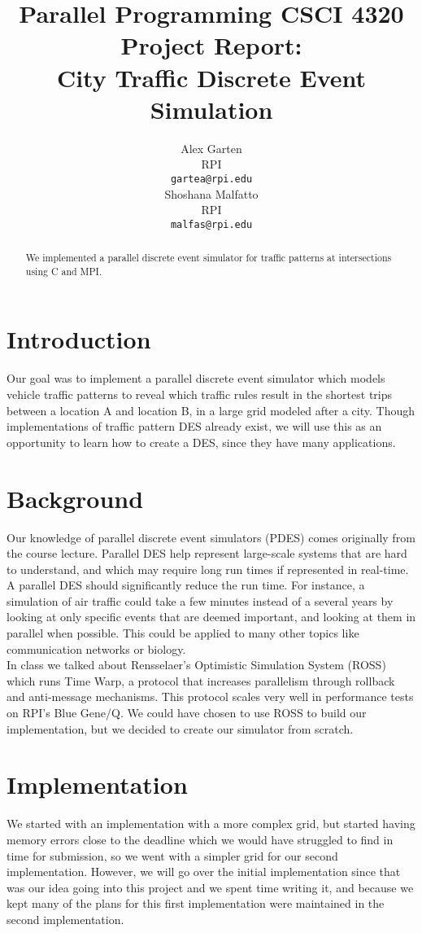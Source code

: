 \documentclass[11pt,a4paper]{article}
\title{Parallel Programming CSCI 4320 Project Report: \\
City Traffic Discrete Event Simulation}
\author{Alex Garten \\
  RPI \\
  \texttt{gartea@rpi.edu} \\\And
  Shoshana Malfatto \\
  RPI \\
  \texttt{malfas@rpi.edu} \\}
\date{}
\begin{document}
\maketitle
\begin{abstract}
    We implemented a parallel discrete event simulator for traffic patterns at intersections using C and MPI.
\end{abstract}

\section{Introduction}

Our goal was to implement a parallel discrete event simulator which models vehicle traffic patterns to reveal which traffic rules result in the shortest trips between a location A and location B, in a large grid modeled after a city. Though implementations of traffic pattern DES already exist, we will use this as an opportunity to learn how to create a DES, since they have many applications.

\section{Background}
Our knowledge of parallel discrete event simulators (PDES) comes originally from the course lecture. Parallel DES help represent large-scale systems that are hard to understand, and which may require long run times if represented in real-time. A parallel DES should significantly reduce the run time. For instance, a simulation of air traffic could take a few minutes instead of a several years by looking at only specific events that are deemed important, and looking at them in parallel when possible. This could be applied to many other topics like communication networks or biology.\\
\tab In class we talked about Rensselaer’s Optimistic Simulation System (ROSS) which runs Time Warp, a protocol that increases parallelism through rollback and anti-message mechanisms. This protocol scales very well in performance tests on RPI's Blue Gene/Q. We could have chosen to use ROSS to build our implementation, but we decided to create our simulator from scratch.

\section{Implementation}

We started with an implementation with a more complex grid, but started having memory errors close to the deadline which we would have struggled to find in time for submission, so we went with a simpler grid for our second implementation. However, we will go over the initial implementation since that was our idea going into this project and we spent time writing it, and because we kept many of the plans for this first implementation were maintained in the second implementation.
\end{document}
